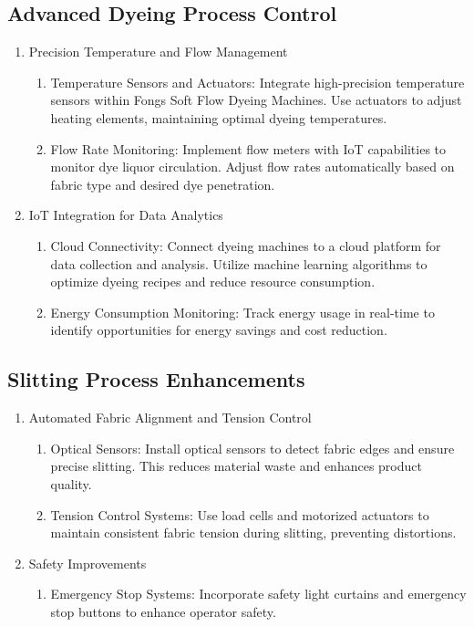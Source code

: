 \subsection{Advanced Dyeing Process Control}
\begin{enumerate}
    \item Precision Temperature and Flow Management
    \begin{enumerate}
        \item Temperature Sensors and Actuators: Integrate high-precision temperature sensors within Fongs Soft Flow Dyeing Machines. Use actuators to adjust heating elements, maintaining optimal dyeing temperatures.
        \item Flow Rate Monitoring: Implement flow meters with IoT capabilities to monitor dye liquor circulation. Adjust flow rates automatically based on fabric type and desired dye penetration.
    \end{enumerate}
    \item IoT Integration for Data Analytics
    \begin{enumerate}
        \item Cloud Connectivity: Connect dyeing machines to a cloud platform for data collection and analysis. Utilize machine learning algorithms to optimize dyeing recipes and reduce resource consumption.
        \item Energy Consumption Monitoring: Track energy usage in real-time to identify opportunities for energy savings and cost reduction.
    \end{enumerate}
\end{enumerate}

\subsection{Slitting Process Enhancements}
\begin{enumerate}
    \item Automated Fabric Alignment and Tension Control
    \begin{enumerate}
        \item Optical Sensors: Install optical sensors to detect fabric edges and ensure precise slitting. This reduces material waste and enhances product quality.
        \item Tension Control Systems: Use load cells and motorized actuators to maintain consistent fabric tension during slitting, preventing distortions.
    \end{enumerate}
    \item Safety Improvements
    \begin{enumerate}
        \item Emergency Stop Systems: Incorporate safety light curtains and emergency stop buttons to enhance operator safety.
    \end{enumerate}
\end{enumerate}

